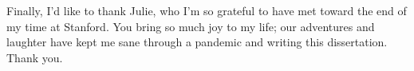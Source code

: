 \documentclass{report}
\begin{document}
Finally, I'd like to thank Julie, who I'm so grateful to have met toward the end of my time at Stanford. You bring so much joy to my life; our adventures and laughter have kept me sane through a pandemic and writing this dissertation. Thank you.  


\afterpreface








%

\appendix







\end{document}
